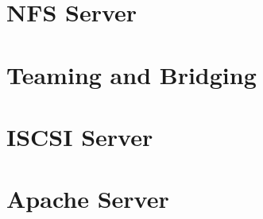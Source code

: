 \documentclass[14pt,fleqn]{extbook} %
\begin{document}
\chapter{NFS Server}


\chapter{Teaming and Bridging}


\chapter{ISCSI Server}


\chapter{Apache Server}


\end{document}
